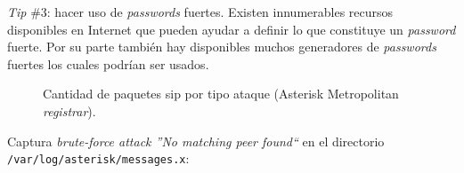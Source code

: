 \documentclass[a4paper,12pt]{report}
\begin{document}
{\emph{Tip} \#3: hacer uso de \emph{passwords} fuertes. Existen innumerables recursos
disponibles en Internet que pueden ayudar a definir lo que constituye un
\emph{password} fuerte. Por su parte también hay disponibles muchos generadores de
\emph{passwords} fuertes los cuales podrían ser usados.\\  

\begin{figure}[h!]
 \centering
 \caption{Cantidad de paquetes \ac{sip} por tipo ataque (Asterisk
Metropolitan \emph{registrar}).}
\label{cant_paq_sip_x_ataque_reg}
\end{figure}

Captura \emph{brute-force attack ''No matching peer found``} en el directorio\\
\texttt{/var/log/asterisk/messages.x}:

}
\end{document}
